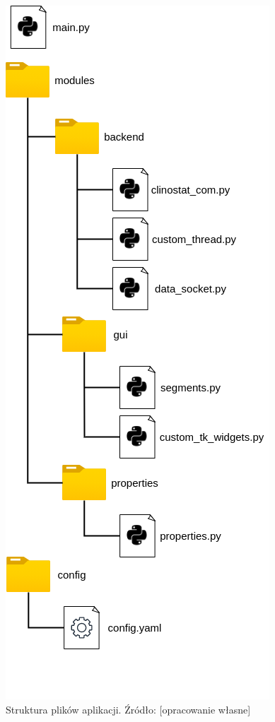 \begin{figure}[h]
	
	\centering
	\includegraphics[scale=.4]{tree}
	\caption{Struktura plików aplikacji. Źródło: [opracowanie własne]} 
	\label{fig:drzewo}
	
\end{figure}
